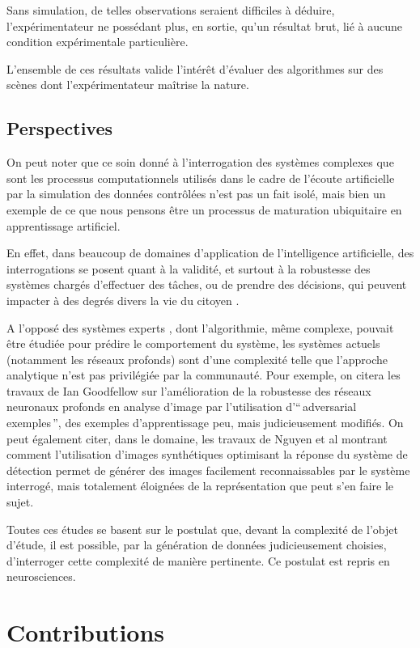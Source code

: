 Sans simulation, de telles observations seraient difficiles à déduire, l’expérimentateur ne possédant plus, en sortie, qu’un résultat brut, lié à aucune condition expérimentale particulière.

L'ensemble de ces résultats valide l'intérêt d'évaluer des algorithmes sur des scènes dont l'expérimentateur maîtrise la nature.

\subsection{Perspectives}

On peut noter que ce soin donné à l'interrogation des systèmes complexes que sont les processus computationnels utilisés dans le cadre de l’écoute artificielle par la simulation des données contrôlées n’est pas un fait isolé, mais bien un exemple de ce que nous pensons être un processus de maturation ubiquitaire en apprentissage artificiel.

En effet, dans beaucoup de domaines d’application de l’intelligence artificielle, des interrogations se posent quant à la validité, et surtout à la robustesse des systèmes chargés d’effectuer des tâches, ou de prendre des décisions, qui peuvent impacter à des degrés divers la vie du citoyen \citep{o2016weapons}.

A l'opposé des systèmes experts \citep{Leondes2002xxiii}, dont l'algorithmie, même complexe, pouvait être étudiée pour prédire le comportement du système, les systèmes actuels (notamment les réseaux profonds) sont d’une complexité telle que l'approche analytique  n'est pas privilégiée par la communauté. Pour exemple, on citera les travaux de Ian Goodfellow sur l'amélioration de la robustesse des réseaux neuronaux profonds en analyse d'image par l'utilisation d'``\,adversarial exemples\,'', des exemples d'apprentissage peu, mais judicieusement modifiés. On peut également citer, dans le domaine, les travaux de Nguyen et al montrant comment l'utilisation d'images synthétiques optimisant la réponse du système de détection permet de générer des images facilement reconnaissables par le système interrogé, mais totalement éloignées de la représentation que peut s'en faire le sujet.

Toutes ces études se basent sur le postulat que, devant la complexité de l'objet d'étude, il est possible, par la génération de données judicieusement choisies, d'interroger cette complexité de manière pertinente. Ce postulat est repris en neurosciences.

\section{Contributions}

